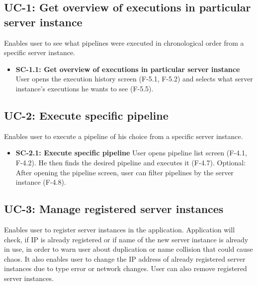 \subsection*{UC-1: Get overview of executions in particular server instance}
Enables user to see what pipelines were executed in chronological order from a specific server instance.

\begin{itemize}
\item \textbf{SC-1.1: Get overview of executions in particular server instance}
User opens the execution history screen (F-5.1, F-5.2) and selects what server instance's executions he wants to see (F-5.5).

\end{itemize}

\subsection*{UC-2: Execute specific pipeline}
Enables user to execute a pipeline of his choice from a specific server instance.

\begin{itemize}
\item \textbf{SC-2.1: Execute specific pipeline}
User opens pipeline list screen (F-4.1, F-4.2). He then finds the desired pipeline and executes it (F-4.7). Optional: After opening the pipeline screen, user can filter pipelines by the server instance (F-4.8).

\end{itemize}

\subsection*{UC-3: Manage registered server instances}
Enables user to register server instances in the application. Application will check, if IP is already registered or if name of the new server instance is already in use, in order to warn user about duplication or name collision that could cause chaos. It also enables user to change the IP address of already registered server instances due to type error or network changes. User can also remove registered server instances.

